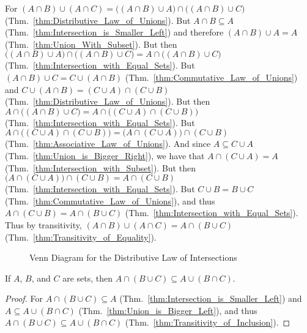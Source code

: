         \begin{bproof}
            For $(A\cap{B})\cup(A\cap{C})=\big((A\cap{B})\cup{A}\big)%
                 \cap\big((A\cap{B})\cup{C}\big)$
            (Thm.~\ref{thm:Distributive_Law_of_Unions}). But
            $A\cap{B}\subseteq{A}$ (Thm.~\ref{thm:Intersection_is_Smaller_Left})
            and therefore $(A\cap{B})\cup{A}=A$
            (Thm.~\ref{thm:Union_With_Subset}). But then
            $\big((A\cap{B})\cup{A}\big)\cap\big((A\cap{B})\cup{C}\big)%
             =A\cap\big((A\cap{B})\cup{C}\big)$
            (Thm.~\ref{thm:Intersection_with_Equal_Sets}). But
            $(A\cap{B})\cup{C}=C\cup(A\cap{B})$
            (Thm.~\ref{thm:Commutative_Law_of_Unions}) and
            $C\cup(A\cap{B})=(C\cup{A})\cap(C\cup{B})$
            (Thm.~\ref{thm:Distributive_Law_of_Unions}). But then
            $A\cap\big((A\cap{B})\cup{C}\big)%
             =A\cap\big((C\cup{A})\cap(C\cup{B})\big)$
            (Thm.~\ref{thm:Intersection_with_Equal_Sets}). But
            $A\cap\big((C\cup{A})\cap(C\cup{B})\big)%
             =\big(A\cap(C\cup{A})\big)\cap(C\cup{B})$
            (Thm.~\ref{thm:Associative_Law_of_Unions}). And since
            $A\subseteq{C}\cup{A}$ (Thm.~\ref{thm:Union_is_Bigger_Right}), we
            have that $A\cap(C\cup{A})=A$
            (Thm.~\ref{thm:Intersection_with_Subset}). But then
            $\big(A\cap(C\cup{A})\big)\cap(C\cup{B})=A\cap(C\cup{B})$
            (Thm.~\ref{thm:Intersection_with_Equal_Sets}). But
            $C\cup{B}=B\cup{C}$ (Thm.~\ref{thm:Commutative_Law_of_Unions}),
            and thus $A\cap(C\cup{B})=A\cap(B\cup{C})$
            (Thm.~\ref{thm:Intersection_with_Equal_Sets}).
            Thus by transitivity, $(A\cap{B})\cup(A\cap{C})=A\cap(B\cup{C})$
            (Thm.~\ref{thm:Transitivity_of_Equality}).
        \end{bproof}
        \begin{figure}[H]
            \centering
            \captionsetup{type=figure}
            
            \caption{Venn Diagram for the Distributive Law of Intersections}
            \label{fig:Venn_Diagram_Distributive_Law_of_Intersections}
        \end{figure}
        \begin{theorem}
            \label{thm:Dist_Law_Inter_Subset_of_Dist_Law_Union}%
            If $A$, $B$, and $C$ are sets, then
            $A\cap(B\cup{C})\subseteq{A}\cup(B\cap{C})$.
        \end{theorem}
        \begin{proof}
            For $A\cap(B\cup{C})\subseteq{A}$
            (Thm.~\ref{thm:Intersection_is_Smaller_Left}) and
            $A\subseteq{A}\cup(B\cap{C})$ (Thm.~\ref{thm:Union_is_Bigger_Left}),
            and thus $A\cap(B\cup{C})\subseteq{A}\cup(B\cap{C})$
            (Thm.~\ref{thm:Transitivity_of_Inclusion}).
        \end{proof}
